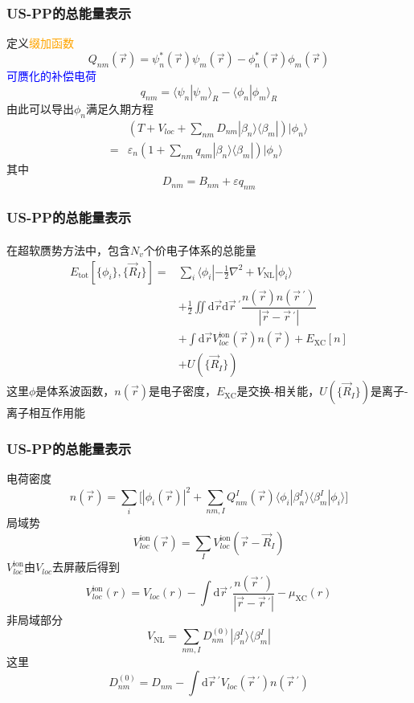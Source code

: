 \documentclass[cjk,slidestop,compress,mathserif,blue]{beamer}
\newcommand{\upcite}[1]{\hspace{0ex}\textsuperscript{\cite{#1}}} %
\begin{document}
\frame
{
	\frametitle{\textrm{US-PP}的总能量表示}
	定义\textcolor{orange}{缀加函数}$$Q_{nm}(\vec r)=\psi_n^{\ast}(\vec r)\psi_m(\vec r)-\phi_n^{\ast}(\vec r)\phi_m(\vec r)$$
	\textcolor{blue}{可赝化的补偿电荷}$$q_{nm}=\langle\psi_n|\psi_m\rangle_R-\langle\phi_n|\phi_m\rangle_R$$
	由此可以导出$\phi_n$满足久期方程
	\begin{displaymath}
		\begin{aligned}
			&\left(T+V_{loc}+\sum_{nm}D_{nm}|\beta_n\rangle\langle\beta_m|\right)|\phi_n\rangle\\
			=&\varepsilon_n\left(1+\sum_{nm}q_{nm}|\beta_n\rangle\langle\beta_m|\right)|\phi_n\rangle
		\end{aligned}
	\end{displaymath}
	其中$$D_{nm}=B_{nm}+\varepsilon q_{nm}$$
}

\frame
{
	\frametitle{\textrm{US-PP}的总能量表示}
	在超软赝势方法中，包含$N_v$个价电子体系的总能量\upcite{PRB47-10142_1993}
	\begin{displaymath}
		\begin{aligned}
			E_{\mathrm{tot}}[\{\phi_i\},\{\vec R_I\}]=&\sum_i\langle\phi_i|-\frac12\nabla^2+V_{\mathrm{NL}}|\phi_i\rangle\\
			&+\frac12\iint\mathrm{d}\vec r\mathrm{d}\vec r\,^{\prime}\dfrac{n(\vec r)n(\vec r\,^{\prime})}{|\vec r-\vec r\,^{\prime}|}\\
			&+\int\mathrm{d}\vec r V_{loc}^{\mathrm{ion}}(\vec r)n(\vec r)+E_{\mathrm{XC}}[n]\\
			&+U(\{\vec R_I\})
		\end{aligned}
	\end{displaymath}
	这里$\phi$是体系波函数，$n(\vec r)$是电子密度，$E_{\mathrm{XC}}$是交换-相关能，$U(\{\vec R_I\})$是离子-离子相互作用能
}

\frame
{
	\frametitle{\textrm{US-PP}的总能量表示}
	电荷密度$$n(\vec r)=\sum_i\big[|\phi_i(\vec r)|^2+\sum_{nm,I}Q_{nm}^I(\vec r)\langle\phi_i|\beta_n^I\rangle\langle\beta_m^I|\phi_i\rangle\big]$$
	局域势$$V_{loc}^{\mathrm{ion}}(\vec r)=\sum_IV_{loc}^{\mathrm{ion}}(\vec r-\vec R_I)$$
	$V_{loc}^{\mathrm{ion}}$由$V_{loc}$去屏蔽后得到$$V_{loc}^{\mathrm{ion}}(r)=V_{loc}(r)-\int\mathrm{d}\vec r\,^{\prime}\dfrac{n(\vec r\,^{\prime})}{|\vec r-\vec r\,^{\prime}|}-\mu_{\mathrm{XC}}(r)$$
	非局域部分$$V_{\mathrm{NL}}=\sum_{nm,I}D_{nm}^{(0)}|\beta_n^I\rangle\langle\beta_m^I|$$
	这里$$D_{nm}^{(0)}=D_{nm}-\int\mathrm{d}\vec r\,^{\prime}V_{loc}(\vec r\,^{\prime})n(\vec r\,^{\prime})$$
}
\end{document}

